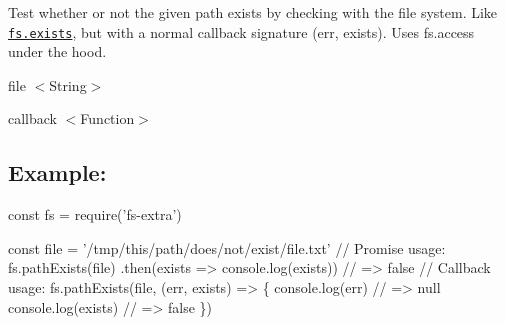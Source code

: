 Test whether or not the given path exists by checking with the file system. Like \href{https://nodejs.org/api/fs.html#fs_fs_exists_path_callback}{\tt {\ttfamily fs.\+exists}}, but with a normal callback signature (err, exists). Uses {\ttfamily fs.\+access} under the hood.


\begin{DoxyItemize}
\item {\ttfamily file} {\ttfamily $<$String$>$}
\item {\ttfamily callback} {\ttfamily $<$Function$>$}
\end{DoxyItemize}

\subsection*{Example\+:}


\begin{DoxyCode}
const fs = require('fs-extra')

const file = '/tmp/this/path/does/not/exist/file.txt'
// Promise usage:
fs.pathExists(file)
  .then(exists => console.log(exists)) // => false
// Callback usage:
fs.pathExists(file, (err, exists) => \{
  console.log(err) // => null
  console.log(exists) // => false
\})
\end{DoxyCode}
 